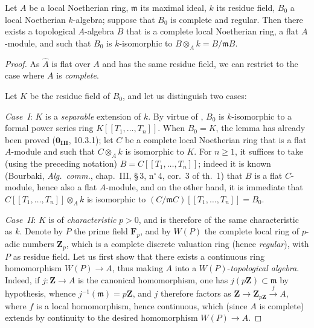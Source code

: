 \begin{lemma}[19.7.1.3]
\label{0.19.7.1.3}
Let $A$ be a local Noetherian ring, $\mathfrak{m}$ its maximal ideal, $k$ its residue field, $B_0$ a local Noetherian $k$-algebra; suppose that $B_0$ is complete and regular.
Then there exists a topological $A$-algebra $B$ that is a complete local Noetherian ring, a flat $A$-module, and such that $B_0$ is $k$-isomorphic to $B\otimes_A k = B/\mathfrak{m}B$.
\end{lemma}

\begin{proof}
As $\widehat{A}$ is flat over $A$ and has the same residue field, we can restrict to the case where $A$ is \emph{complete}.

Let $K$ be the residue field of $B_0$, and let us distinguish two cases:

\medskip
\noindent\emph{Case~I}: $K$ is a \emph{separable} extension of $k$.
By virtue of , $B_0$ is $k$-isomorphic to a formal power series ring $K[[T_1,\ldots,T_n]]$.
When $B_0=K$, the lemma has already been proved ($\mathbf{0_{III}}$, 10.3.1); let $C$ be a complete local Noetherian ring that is a flat $A$-module and such that $C\otimes_A k$ is isomorphic to $K$.
For $n\geq 1$, it suffices to take (using the preceding notation) $B=C[[T_1,\ldots,T_n]]$; indeed it is known (Bourbaki, \emph{Alg.\ comm.}, chap.~III, \S\,3, n$^\circ$\,4, cor.~3 of th.~1) that $B$ is a flat $C$-module, hence also a flat $A$-module, and on the other hand, it is immediate that $C[[T_1,\ldots,T_n]]\otimes_A k$ is isomorphic to $(C/\mathfrak{m}C)[[T_1,\ldots,T_n]]=B_0$.

\medskip
\noindent\emph{Case~II}: $K$ is of \emph{characteristic} $p>0$, and is therefore of the same characteristic as $k$.
Denote by $P$ the prime field $\mathbf{F}_p$, and by $W(P)$ the complete local ring of $p$-adic numbers $\mathbf{Z}_p$, which is a complete discrete valuation ring (hence \emph{regular}), with $P$ as residue field.
Let us first show that there exists a continuous ring homomorphism $W(P)\to A$, thus making $A$ into a $W(P)$-\emph{topological algebra}.
Indeed, if $j:\mathbf{Z}\to A$ is the canonical homomorphism, one has $j(p\mathbf{Z})\subset\mathfrak{m}$ by hypothesis, whence $j^{-1}(\mathfrak{m})=p\mathbf{Z}$, and $j$ therefore factors as $\mathbf{Z}\to\mathbf{Z}_{p\mathbf{Z}}\xrightarrow{f}A$, where $f$ is a local homomorphism, hence continuous, which (since $A$ is complete) extends by continuity to the desired homomorphism $W(P)\to A$.


\end{proof}
